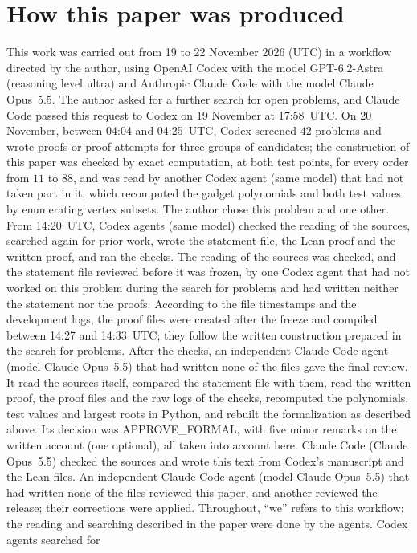 \documentclass[11pt]{article}
\theoremstyle{definition}
\theoremstyle{remark}
\begin{document}
\section*{How this paper was produced}
This work was carried out from 19 to 22 November 2026 (UTC) in a workflow
directed by the author, using OpenAI Codex with the model GPT-6.2-Astra
(reasoning level ultra) and Anthropic Claude Code with the model Claude
Opus~5.5. The author asked for a further search for open problems, and Claude
Code passed this request to Codex on 19 November at 17:58~UTC. On 20 November,
between 04:04 and 04:25~UTC, Codex screened $42$ problems
and wrote proofs or proof attempts for three groups of candidates; the construction of this paper
was checked by exact computation, at both test points, for every order from
$11$ to $88$, and was read by another Codex agent (same model) that had not
taken part in it, which recomputed the gadget polynomials and both test
values by enumerating vertex subsets. The author chose this problem and one other. From 14:20~UTC,
Codex agents (same model) checked the reading of the sources, searched again
for prior work, wrote the statement file, the Lean proof and the written proof,
and ran the checks. The reading of the sources was checked, and the statement
file reviewed before it was frozen, by one Codex agent that had not worked
on this problem during the search for problems and had written neither
the statement nor the proofs. According to the file timestamps and the
development logs, the proof files were created after the freeze and compiled between 14:27 and 14:33~UTC;
they follow the written construction prepared in the search for problems. After the checks, an independent Claude Code agent (model Claude
Opus~5.5) that had written none of the files gave the final review. It read
the sources itself, compared the statement file with them, read the written
proof, the proof files and the raw logs of the checks, recomputed the
polynomials, test values and largest roots in Python, and rebuilt the formalization as described above. Its decision was
APPROVE\_FORMAL, with five minor remarks on the written account (one optional), all
taken into account here. Claude Code (Claude Opus~5.5) checked the sources and
wrote this text from Codex's manuscript and the Lean files. An independent Claude Code agent (model Claude Opus~5.5) that had written none of the files reviewed this paper, and another reviewed the release; their corrections were applied.
Throughout, ``we'' refers to this workflow; the reading and searching
described in the paper were done by the agents. Codex agents searched for
\end{document}
